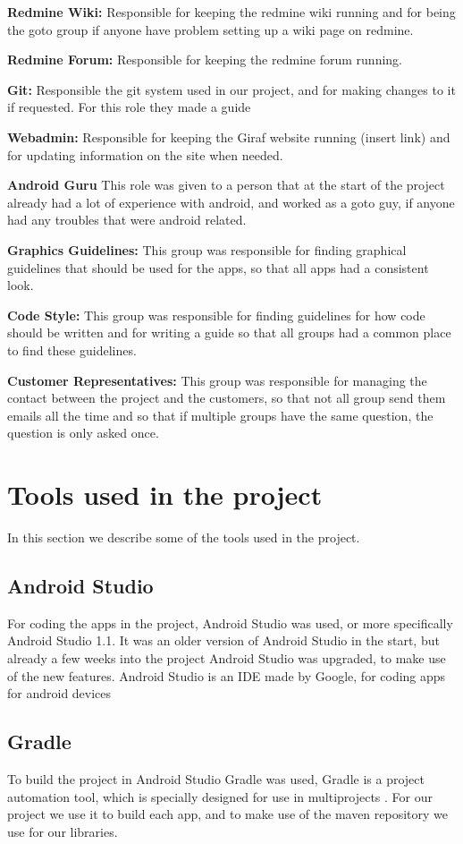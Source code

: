 \textbf{Redmine Wiki:}
Responsible for keeping the redmine wiki running and for being the goto group if anyone have problem setting up a wiki page on redmine.

\textbf{Redmine Forum:}
Responsible for keeping the redmine forum running.
 
\textbf{Git:}
Responsible the git system used in our project, and for making changes to it if requested. For this role they made a guide

\textbf{Webadmin:}
Responsible for keeping the Giraf website running (insert link) and for updating information on the site when needed.

\textbf{Android Guru}
This role was given to a person that at the start of the project already had a lot of experience with android, and worked as a goto guy, if anyone had any troubles that were android related.

\textbf{Graphics Guidelines:}
This group was responsible for finding graphical guidelines that should be used for the apps, so that all apps had a consistent look.

\textbf{Code Style:}
This group was responsible for finding guidelines for how code should be written and for writing a guide so that all groups had a common place to find these guidelines.


\textbf{Customer Representatives:}
This group was responsible for managing the contact between the project and the customers, so that not all group send them emails all the time and so that if multiple groups have the same question, the question is only asked once.


\section{Tools used in the project}
In this section we describe some of the tools used in the project.

\subsection{Android Studio}
For coding the apps in the project, Android Studio was used, or more specifically Android Studio 1.1. It was an older version of Android Studio in the start, but already a few weeks into the project Android Studio was upgraded, to make use of the new features. Android Studio is an IDE made by Google, for coding apps for android devices \citep{AndroidStudio}

\subsection{Gradle}
To build the project in Android Studio Gradle was used, Gradle is a project automation tool, which is specially designed for use in multiprojects \citep{Gradle}. For our project we use it to build each app, and to make use of the maven repository we use for our libraries.

